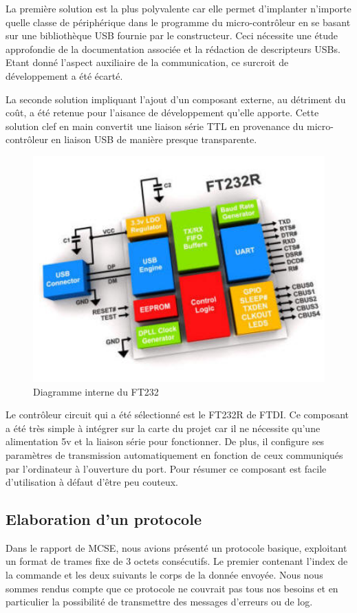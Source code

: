 \documentclass[11pt, french]{article} %
\begin{document}
\medskip
La première solution est la plus polyvalente car elle permet d'implanter n'importe quelle classe de périphérique dans le programme du micro-contrôleur en se basant sur une bibliothèque USB fournie par le constructeur. Ceci nécessite une étude approfondie de la documentation associée et la rédaction de descripteurs USBs. Etant donné l'aspect auxiliaire de la communication, ce surcroit de développement a été écarté.

La seconde solution impliquant l'ajout d'un composant externe, au détriment du coût, a été retenue pour l'aisance de développement qu'elle apporte. Cette solution clef en main convertit une liaison série TTL en provenance du micro-contrôleur en liaison USB de manière presque transparente.

\begin{figure}[h!]
	\centering
	\includegraphics[width = 12cm]{SolutionNumerique/diagrammeFT232.jpg} 
	\caption{Diagramme interne du FT232}
\end{figure}

Le contrôleur circuit qui a été sélectionné est le FT232R de FTDI. Ce composant a été très simple à intégrer sur la carte du projet car il ne nécessite qu'une alimentation 5v et la liaison série pour fonctionner. De plus, il configure ses paramètres de transmission automatiquement en fonction de ceux communiqués par l'ordinateur à l'ouverture du port. Pour résumer ce composant est facile d'utilisation à défaut d'être peu couteux.

\subsection{Elaboration d'un protocole}
Dans le rapport de MCSE, nous avions présenté un protocole basique, exploitant un format de trames fixe de 3 octets consécutifs. Le premier contenant l'index de la commande et les deux suivants le corps de la donnée envoyée. Nous nous sommes rendus compte que ce protocole ne couvrait pas tous nos besoins et en particulier la possibilité de transmettre des messages d'erreurs ou de log.
\end{document}
